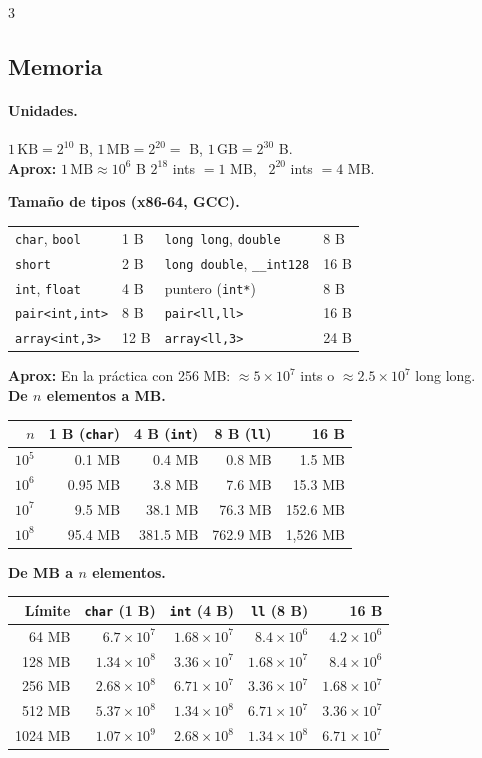 \documentclass[8pt, spanish, mexico, letterpaper]{extarticle}
\newcommand{\<}{<}
\begin{document}
\begin{multicols*}{3}
\subsection*{Memoria}

\paragraph{Unidades.}
\(1\,\text{KB} = 2^{10} \) B, \quad \(1\,\text{MB} = 2^{20} =\) B, \quad \(1\,\text{GB} = 2^{30}\) B.\\
\textbf{Aprox:} \(1\,\text{MB} \approx 10^{6}\) B 
$2^{18}$ ints $=1$ MB, \  $2^{20}$ ints $=4$ MB.


\textbf{Tamaño de tipos (x86-64, GCC).} \\
\begin{tabular}{ll|ll}
\texttt{char}, \texttt{bool} & 1 B & \texttt{long long}, \texttt{double} & 8 B \\
\texttt{short} & 2 B & \texttt{long double}, \texttt{\_\_int128} & 16 B \\
\texttt{int}, \texttt{float} & 4 B & puntero (\texttt{int*}) & 8 B \\
\texttt{pair<int,int>} & 8 B & \texttt{pair<ll,ll>} & 16 B \\
\texttt{array<int,3>} & 12 B & \texttt{array<ll,3>} & 24 B 
\end{tabular}
\textbf{Aprox:} En la práctica con 256 MB: $\approx 5\times10^{7}$ ints o $\approx 2.5\times10^{7}$ long long.\\
\textbf{De $n$ elementos a MB.}\\
\begin{tabular}{r|rrrr}
$n$ & 1 B (\texttt{char}) & 4 B (\texttt{int}) & 8 B (\texttt{ll}) & 16 B \\ \hline
$10^5$ & 0.1 MB & 0.4 MB & 0.8 MB & 1.5 MB \\
$10^6$ & 0.95 MB & 3.8 MB & 7.6 MB & 15.3 MB \\
$10^7$ & 9.5 MB & 38.1 MB & 76.3 MB & 152.6 MB \\
$10^8$ & 95.4 MB & 381.5 MB & 762.9 MB & 1,526 MB 
\end{tabular}


\textbf{De MB a $n$ elementos.}\\
\begin{tabular}{r|rrrr}
Límite & \texttt{char} (1 B) & \texttt{int} (4 B) & \texttt{ll} (8 B) & 16 B \\ \hline
64 MB  & $6.7\times10^{7}$ & $1.68\times10^{7}$ & $8.4\times10^{6}$ & $4.2\times10^{6}$ \\
128 MB & $1.34\times10^{8}$ & $3.36\times10^{7}$ & $1.68\times10^{7}$ & $8.4\times10^{6}$ \\
256 MB & $2.68\times10^{8}$ & $6.71\times10^{7}$ & $3.36\times10^{7}$ & $1.68\times10^{7}$ \\
512 MB & $5.37\times10^{8}$ & $1.34\times10^{8}$ & $6.71\times10^{7}$ & $3.36\times10^{7}$ \\
1024 MB & $1.07\times10^{9}$ & $2.68\times10^{8}$ & $1.34\times10^{8}$ & $6.71\times10^{7}$ \\
\end{tabular}\\




\end{multicols*}
\end{document}
